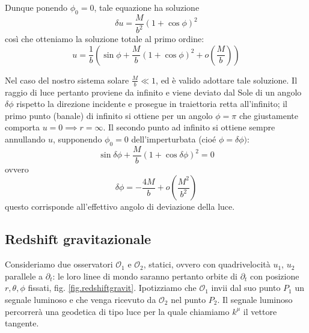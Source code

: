 Dunque ponendo $\phi_0 = 0$, tale equazione ha soluzione
\begin{equation}
    \delta u = \frac{M}{b^2}(1+ \cos\phi)^2
    \label{eq.deviazione_perturbazione_soluzione}
\end{equation}
così che otteniamo la soluzione totale al primo ordine:
\begin{equation}
    u=\frac{1}{b}\left(  \sin\phi+ \frac{M}{b}(1+\cos\phi)^2 + o(\frac{M}{b})   \right)
    \label{eq.deviazione_totale_soluzione}
\end{equation}

Nel caso del nostro sistema solare $\frac{M}{b} \ll 1$, ed è valido adottare tale soluzione. Il raggio di luce pertanto proviene da infinito e viene deviato dal Sole di un angolo $\delta \phi$ rispetto la direzione incidente e prosegue in traiettoria retta all'infinito; il primo punto (banale) di infinito si ottiene per un angolo $\phi = \pi$ che giustamente comporta $u= 0 \implies r= \infty$. Il secondo punto ad infinito si ottiene sempre annullando $u$, supponendo $\phi_0 = 0$ dell'imperturbata (cioé $\phi = \delta \phi)$:
\begin{equation*}
     \sin\delta\phi+ \frac{M}{b}(1+\cos\delta\phi)^2 = 0
\end{equation*}
ovvero
\begin{equation}
    \delta \phi = - \frac{4M}{b} + o(\frac{M^2}{b^2})
    \label{eq.angolo_deviazione_luce}
\end{equation}
questo corrisponde all'effettivo angolo di deviazione della luce.

\subsection{Redshift gravitazionale}
Consideriamo due osservatori $\mathcal{O}_1$ e $\mathcal{O}_2$, statici, ovvero con quadrivelocità $u_1$, $u_2$ parallele a $\partial_t$: le loro linee di mondo saranno pertanto orbite di $\partial_t$ con posizione $r, \theta, \phi$ fissati, fig. \ref{fig.redshiftgravit}.
Ipotizziamo che $\mathcal{O}_1$ invii dal suo punto $P_1$ un segnale luminoso e che venga ricevuto da $\mathcal{O}_2$ nel punto $P_2$. Il segnale luminoso percorrerà una geodetica di tipo luce per la quale chiamiamo $k^\mu$ il vettore tangente.


